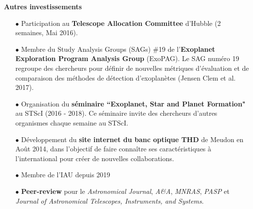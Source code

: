 \documentclass[11pt, a4paper, french]{article}
\begin{document}
\textbf{Autres investissements}\\
\vspace{-0.1cm}
\begin{itemize} \itemsep 5pt
    \item[$\bullet$] \small Participation au {\bf Telescope Allocation Committee} d'Hubble (2 semaines, Mai 2016).
    \item[$\bullet$] \small Membre du Study Analysis Groups (SAGs) \#19 de l'\textbf{Exoplanet Exploration Program Analysis Group} (ExoPAG). Le SAG numéro 19 regroupe des chercheurs pour définir de nouvelles métriques d'évaluation et de comparaison des méthodes de détection d'exoplanètes (Jensen Clem et al. 2017).
    \item[$\bullet$] \small Organisation du \textbf{séminaire ``Exoplanet, Star and Planet Formation"} au STScI (2016 - 2018). Ce séminaire invite des chercheurs d'autres organismes chaque semaine au STScI.
    \item[$\bullet$] \small Développement du \textbf{site internet du banc optique THD} de Meudon en Août 2014, dans l'objectif de faire connaître ses caractéristiques à l'international pour créer de nouvelles collaborations.
    \item[$\bullet$] \small Membre de l'IAU depuis 2019
    \item[$\bullet$] \small \textbf{Peer-review} pour le \textit{Astronomical Journal}, \textit{A\&A}, \textit{MNRAS}, \textit{PASP} et \textit{Journal of Astronomical Telescopes, Instruments, and Systems}.
\end{itemize}


\end{document}
